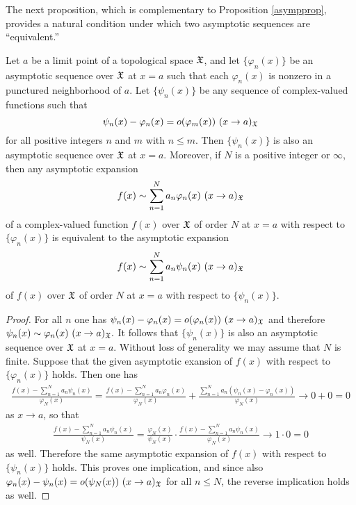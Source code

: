 \documentclass[12pt]{article}
\begin{document}
The next proposition, which is complementary to Proposition \ref{asympprop}, provides a natural condition under which two asymptotic sequences are ``equivalent.''   

\begin{proposition}\label{asympprop2a}
Let $a$ be a limit point of a topological space ${\mathfrak X}$, and let $\{\varphi_n(x)\}$ be an asymptotic sequence over ${\mathfrak X}$ at $x = a$ such that each $\varphi_n(x)$ is nonzero in a punctured neighborhood of $a$.  Let 
$\{\psi_n(x)\}$ be  any sequence of complex-valued functions such that
$$\psi_n(x) -\varphi_n(x) = o(\varphi_m(x)) \ (x \to a)_{\mathfrak X}$$ for all positive integers $n$ and $m$ with $n \leq m$.   Then $\{\psi_n(x)\}$ is also an asymptotic sequence over ${\mathfrak X}$ at $x = a$.  Moreover, if $N$ is a positive integer or $\infty$, then any asymptotic expansion 
$$f(x) \sim \sum_{n = 1}^N a_n \varphi_n(x) \ (x \to a)_{\mathfrak X}$$
of a complex-valued function $f(x)$ over ${\mathfrak X}$ of order $N$ at $x = a$ with respect to $\{\varphi_n(x)\}$ is equivalent to the asymptotic expansion $$f(x) \sim \sum_{n = 1}^N a_n \psi_n(x) \ (x \to a)_{\mathfrak X}$$
of $f(x)$ over ${\mathfrak X}$ of order $N$ at $x = a$ with respect to $\{\psi_n(x)\}$.
\end{proposition}

\begin{proof}
For all $n$ one has $\psi_n(x) -\varphi_n(x) = o(\varphi_n(x)) \ (x \to a)_{\mathfrak X}$ and therefore $\psi_n(x) \sim \varphi_n(x) \ (x \to a)_{\mathfrak X}.$  It follows that $\{\psi_n(x)\}$ is also an asymptotic sequence over ${\mathfrak X}$ at $x = a$.  Without loss of generality we may assume that $N$ is finite.  Suppose that the given asymptotic exansion of $f(x)$  with respect to $\{\varphi_n(x)\}$ holds.   Then one has
\begin{align*} \frac{f(x) - \sum_{n = 1}^N a_n \psi_n(x)}{\varphi_N(x)}  =  \frac{f(x) - \sum_{n = 1}^N a_n \varphi_n(x)}{\varphi_N(x)} +  \frac{\sum_{n = 1}^N a_n (\psi_n(x)-\varphi_n(x))}{\varphi_N(x)} \to 0 + 0 = 0
\end{align*}
as $x \to a$, so that 
\begin{align*} \frac{f(x) - \sum_{n = 1}^N a_n \psi_n(x)}{\psi_N(x)} =  \frac{\varphi_N(x)}{\psi_N(x)} \cdot \frac{f(x) - \sum_{n = 1}^N a_n \psi_n(x)}{\varphi_N(x)}  \to 1 \cdot 0 = 0 
\end{align*}
as well.  Therefore the same asymptotic expansion of $f(x)$ with respect to $\{\psi_n(x)\}$ holds.    This proves one implication, and since also $\varphi_n(x) -\psi_n(x) = o(\psi_N(x)) \ (x \to a)_{\mathfrak X}$ for all $n \leq N$, the reverse implication holds as well.
\end{proof}
\end{document}
